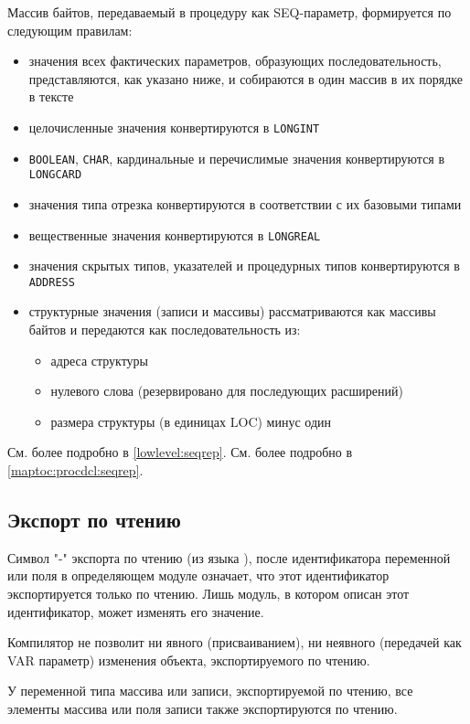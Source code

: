 Массив байтов, передаваемый в процедуру как
SEQ-параметр, формируется по следующим правилам:
\begin{itemize}
\item
  значения всех фактических параметров, образующих последовательность,
представляются, как указано ниже, и собираются в один массив в их
порядке в тексте
\item целочисленные значения конвертируются в {\tt LONGINT}
\item {\tt BOOLEAN}, {\tt CHAR}, кардинальные и перечислимые значения
конвертируются в {\tt LONGCARD}
\item значения типа отрезка конвертируются в соответствии с их базовыми типами
\item вещественные значения конвертируются в {\tt LONGREAL}
\item значения скрытых типов, указателей и
процедурных типов конвертируются в {\tt ADDRESS}
\item структурные значения (записи и массивы) рассматриваются как 
массивы байтов и передаются как последовательность из:
    \begin{itemize}
    \item адреса структуры
    \item нулевого слова (резервировано для последующих расширений)
    \item размера структуры (в единицах LOC) минус один
    \end{itemize}
\end{itemize}

\ifgencode
  См. более подробно в \ref{lowlevel:seqrep}.
\fi
\ifgenc
  См. более подробно в \ref{maptoc:procdcl:seqrep}.
\fi

\subsection{Экспорт по чтению}\label{RO:export}

\mextonly

Символ "-" экспорта по чтению (из языка \ot{}), после идентификатора 
переменной или поля в определяющем модуле означает, что этот
идентификатор экспортируется только по чтению. Лишь модуль, в 
котором описан этот идентификатор, может изменять его значение.

Компилятор не позволит ни явного (присваиванием), ни неявного
(передачей как VAR параметр) изменения объекта, экспортируемого 
по чтению.

У переменной типа массива или записи, экспортируемой по чтению,
все элементы массива или поля записи также экспортируются по чтению.

